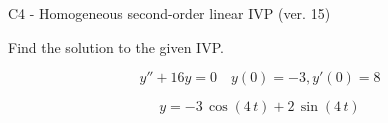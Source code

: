 \begin{exercise}
  \begin{exerciseTitle}C4 - Homogeneous second-order linear IVP (ver. 15)\end{exerciseTitle}
  \begin{exerciseStatement}
    
Find the solution to the given IVP.

    
\[y''+16y = 0 \hspace{1em} y(0) = -3 , y'(0) = 8\]

  \end{exerciseStatement}
  \begin{exerciseAnswer}
    
\[y= -3 \, \cos\left(4 \, t\right) + 2 \, \sin\left(4 \, t\right)\]

  \end{exerciseAnswer}
\end{exercise}